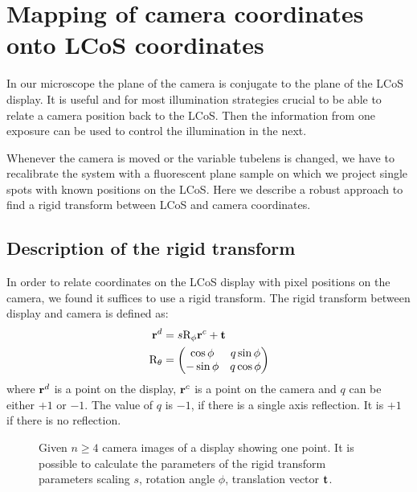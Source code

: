 \chapter{Mapping of camera coordinates onto LCoS coordinates}
\label{sec:rigid}
\begin{summary}
  In our microscope the plane of the camera is conjugate to the plane
  of the LCoS display. It is useful and for most illumination
  strategies crucial to be able to relate a camera position back to
  the LCoS. Then the information from one exposure can be used to
  control the illumination in the next.

  Whenever the camera is moved or the variable tubelens is changed, we
  have to recalibrate the system with a fluorescent plane sample on
  which we project single spots with known positions on the LCoS. Here
  we describe a robust approach to find a rigid transform between LCoS
  and camera coordinates.
\end{summary}
\section{Description of the rigid transform}
In order to relate coordinates on the LCoS display with pixel
positions on the camera, we found it suffices to use a rigid
transform. The rigid transform between display and camera is defined
as:
\begin{align}
  \mathbf{r}^d&=s \textrm{R}_\phi \mathbf{r}^c + \mathbf{t}\\
  \textrm{R}_\theta&=\begin{pmatrix}
  \cos\phi & q\sin\phi \\
  -\sin\phi & q\cos\phi \\ 
  \end{pmatrix}
\end{align}
where $\mathbf{r}^d$ is a point on the display, $\mathbf{r}^c$ is a point on the
camera and $q$ can be either $+1$ or $-1$. The value of $q$ is $-1$,
if there is a single axis reflection. It is $+1$ if there is no
reflection.

\begin{figure}[!hbt]
  \centering
  
  \caption{Given $n\ge 4$ camera images of a display showing one
    point.  It is possible to calculate the parameters of the rigid
    transform parameters scaling $s$, rotation angle $\phi$,
    translation vector $\mathbf{t}$.}
  \label{fig:calib-align}
\end{figure}



